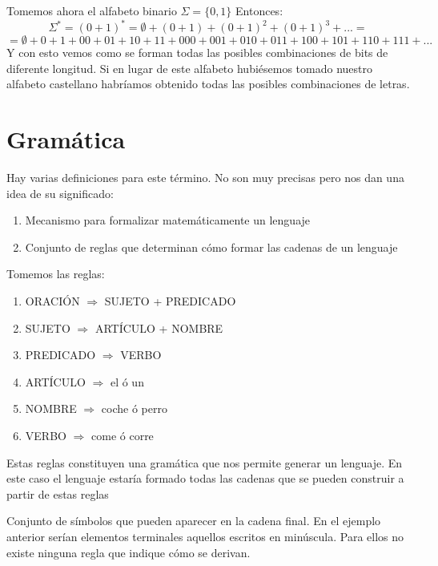 \documentclass{apuntes}
\begin{document}
Tomemos ahora el alfabeto binario $\Sigma = \lbrace 0, 1 \rbrace$
Entonces:
\[\Sigma ^* = (0+1)^* = \emptyset + (0+1)+(0+1)^2+(0+1)^3+... = \]
\[= \emptyset + 0 + 1 + 00 + 01 +10 +11 +000+001+010+011+100+101+110+111+...\]
Y con esto vemos como se forman todas las posibles combinaciones de bits de diferente longitud. Si en lugar de este alfabeto hubiésemos tomado nuestro alfabeto castellano habríamos obtenido todas las posibles combinaciones de letras.

\section{Gramática}
\begin{defn}[Gramática]
Hay varias definiciones para este término. No son muy precisas pero nos dan una idea de su significado:
\begin{enumerate}
\item Mecanismo para formalizar matemáticamente un lenguaje
\item Conjunto de reglas que determinan cómo formar las cadenas de un lenguaje
\end{enumerate}
\end{defn}

\begin{example}
Tomemos las reglas:
\begin{enumerate}
\item ORACIÓN $\Rightarrow$ SUJETO + PREDICADO
\item SUJETO $\Rightarrow$ ARTÍCULO + NOMBRE
\item PREDICADO $\Rightarrow$ VERBO
\item ARTÍCULO $\Rightarrow$ el ó un
\item NOMBRE $\Rightarrow$ coche ó perro
\item VERBO $\Rightarrow$ come ó corre
\end{enumerate}
Estas reglas constituyen una gramática que nos permite generar un lenguaje. En este caso el lenguaje estaría formado todas las cadenas que se pueden construir a partir de estas reglas
\end{example}

\begin{defn}
Conjunto de símbolos que pueden aparecer en la cadena final. En el ejemplo anterior serían elementos terminales aquellos escritos en minúscula. Para ellos no existe ninguna regla que indique cómo se derivan.
\end{defn}
\end{document}
